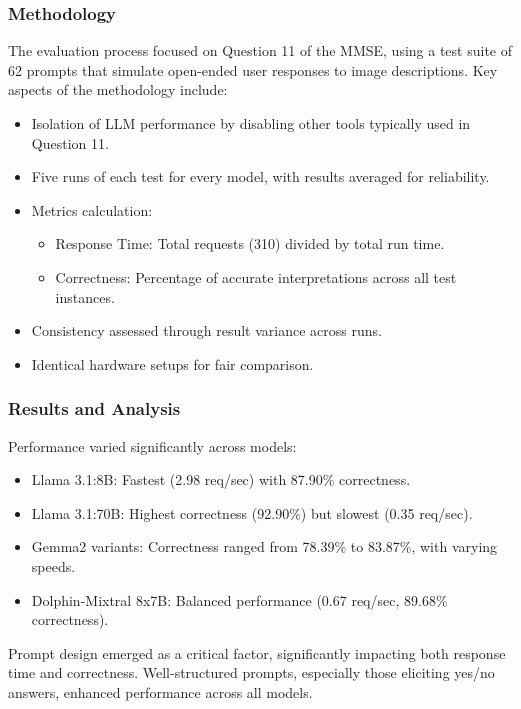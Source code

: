 \subsubsection{Methodology}
The evaluation process focused on Question 11 of the MMSE, using a test suite of 62 prompts that simulate open-ended user responses to image descriptions. Key aspects of the methodology include:

\begin{itemize}
    \item Isolation of LLM performance by disabling other tools typically used in Question 11.
    \item Five runs of each test for every model, with results averaged for reliability.
    \item Metrics calculation: 
        \begin{itemize}
            \item Response Time: Total requests (310) divided by total run time.
            \item Correctness: Percentage of accurate interpretations across all test instances.
        \end{itemize}
    \item Consistency assessed through result variance across runs.
    \item Identical hardware setups for fair comparison.
\end{itemize}

\subsubsection{Results and Analysis}
Performance varied significantly across models:

\begin{itemize}
    \item Llama 3.1:8B: Fastest (2.98 req/sec) with 87.90\% correctness.
    \item Llama 3.1:70B: Highest correctness (92.90\%) but slowest (0.35 req/sec).
    \item Gemma2 variants: Correctness ranged from 78.39\% to 83.87\%, with varying speeds.
    \item Dolphin-Mixtral 8x7B: Balanced performance (0.67 req/sec, 89.68\% correctness).
\end{itemize}

Prompt design emerged as a critical factor, significantly impacting both response time and correctness. Well-structured prompts, especially those eliciting yes/no answers, enhanced performance across all models.

